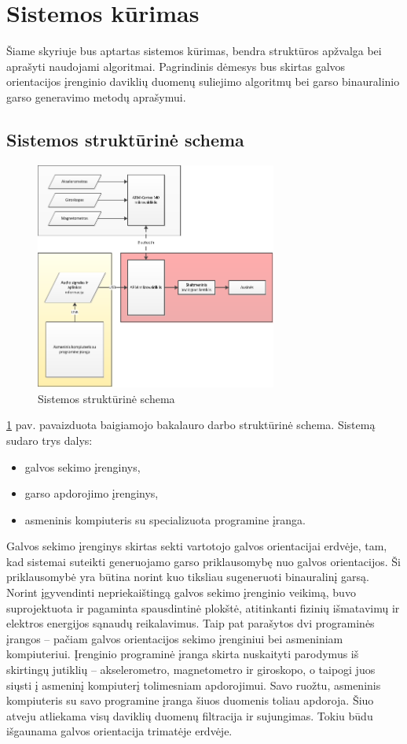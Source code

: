 \documentclass[]{vgtuef}
\begin{document}
\section{Sistemos kūrimas}

Šiame skyriuje bus aptartas sistemos kūrimas, bendra struktūros apžvalga bei aprašyti naudojami algoritmai. Pagrindinis dėmesys bus skirtas galvos orientacijos įrenginio daviklių duomenų suliejimo algoritmų bei garso binauralinio garso generavimo metodų aprašymui.

\subsection{Sistemos struktūrinė schema}

\begin{figure}[!h]
  \centering
  \includegraphics[width=300px]{img/schema.png}
  \caption{Sistemos struktūrinė schema}
  \label{fig:full_schematic}
\end{figure}

\ref{fig:full_schematic} pav. pavaizduota baigiamojo bakalauro darbo struktūrinė schema. Sistemą sudaro trys dalys:

\begin{itemize}
\item galvos sekimo įrenginys,
\item garso apdorojimo įrenginys,
\item asmeninis kompiuteris su specializuota programine įranga.
\end{itemize}

Galvos sekimo įrenginys skirtas sekti vartotojo galvos orientacijai erdvėje, tam, kad sistemai suteikti generuojamo garso priklausomybę nuo galvos orientacijos. Ši priklausomybė yra būtina norint kuo tiksliau sugeneruoti binauralinį garsą. Norint įgyvendinti nepriekaištingą galvos sekimo įrenginio veikimą, buvo suprojektuota ir pagaminta spausdintinė plokštė, atitinkanti fizinių išmatavimų ir elektros energijos sąnaudų reikalavimus. Taip pat parašytos dvi programinės įrangos – pačiam galvos orientacijos sekimo įrenginiui bei asmeniniam kompiuteriui. Įrenginio programinė įranga skirta nuskaityti parodymus iš skirtingų jutiklių – akselerometro, magnetometro ir giroskopo, o taipogi juos siųsti į asmeninį kompiuterį tolimesniam apdorojimui. Savo ruožtu, asmeninis kompiuteris su savo programine įranga šiuos duomenis toliau apdoroja. Šiuo atveju atliekama visų daviklių duomenų filtracija ir sujungimas. Tokiu būdu išgaunama galvos orientacija trimatėje erdvėje.
\end{document}
